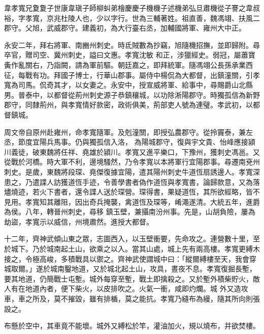 
\begin{pinyinscope}

 韋孝寬兄夐夐子世康韋瑱子師柳虯弟檜慶慶子機機子述機弟弘旦肅機從子謇之韋叔裕，字孝寬，京兆杜陵人也，少以字行。世為三輔著姓。祖直善，魏馮翊、扶風二郡守。父旭，武威郡守。建義初，為大行臺右丞，加輔國將軍、雍州大中正。



 永安二年，拜右將軍、南豳州刺史。時氐賊數為抄竊，旭隨機招撫，並即歸附。尋卒官，贈司空、冀州刺史，謚曰文惠。孝寬沈敏
 和正，涉獵經史。弱冠，屬蕭寶夤作亂關右，乃詣闕，請為軍前驅。朝廷嘉之，即拜統軍。隨馮翊公長孫承業西征，每戰有功。拜國子博士，行華山郡事。屬侍中楊侃為大都督，出鎮潼關，引孝寬為司馬。侃奇其才，以女妻之。永安中，授宣威將軍、給事中，尋賜爵山北縣男。普泰中，以都督從荊州刺史源子恭鎮穰城，以功除淅陽郡守。時獨孤信為新野郡守，同隸荊州，與孝寬情好款密，政術俱美，荊部吏人號為連璧。孝武初，以都督鎮城。



 周文帝自原州赴雍州，命孝寬隨軍。及剋潼關，即授弘農郡守。從拎竇泰，兼左丞，節度宜陽兵馬事。仍與獨孤信入洛，
 為陽城郡守，復與宇文貴、怡峰應接潁川義徒，破東魏將任祥、堯雄於潁川。孝寬又進平樂口，下豫州，獲刺史馮邕。又從戰於河橋。時大軍不利，邊境騷然，乃令孝寬以本將軍行宜陽郡事。尋遷南兗州刺史。是歲，東魏將段琛、堯傑復據宜陽，遣其陽州刺史牛道恆扇誘邊人。孝寬深患之，乃遣諜人訪獲道恆手迹，令善學書者偽作道恆與孝寬書，論歸款意，又為落燼燒迹，若火下書者，還令諜人送於琛營。琛得書，果疑道恆，其所欲經略，皆不見用。孝寬知其離阻，因出奇兵掩襲，禽道恆及琛等，崤澠遂清。大統五年，進爵為侯。八年，轉晉州刺史，尋移
 鎮玉壁，兼攝南汾州事。先是，山胡負險，屢為劫盜，孝寬示以威信，州境肅然。進授大都督。



 十二年，齊神武傾山東之眾，志圖西入，以玉壁衝要，先命攻之。連營數十里，至於城下。乃於城南起土山，欲乘之以入。當其山處，城上先有兩高樓。孝寬更縛木接之，令極高峻，多積戰具以禦之。齊神武使謂城中曰：「縱爾縛樓至天，我會穿城取爾。」遂於城南鑿地道，又於城北起土山，攻具，晝夜不息。孝寬復掘長塹，要其地道，仍簡戰士屯塹。城外每穿至塹，戰土即擒殺之。又於塹外積柴貯火，敵人有在地道內者，便下柴火，以皮排吹之。火氣一衝，咸即灼爛。城
 外又造攻車，車之所及，莫不摧毀，雖有排楯，莫之能抗。孝寬乃縫布為縵，隨其所向則張設之。



 布懸於空中，其車竟不能壞。城外又縛松於竿，灌油加火，規以燒布，并欲焚樓。




\end{pinyinscope}
